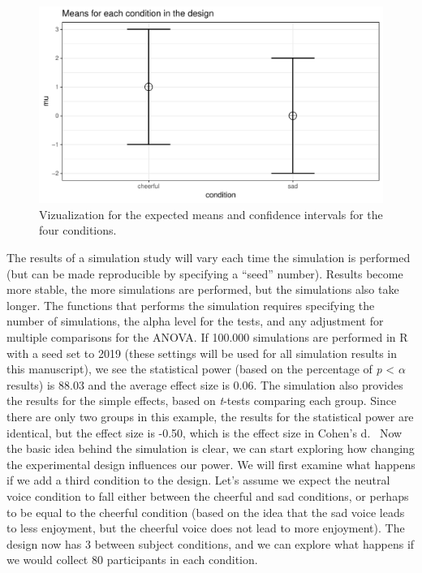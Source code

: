 \documentclass[,jou, draftfirst, a4paper,floatsintext]{apa6}
\begin{document}
\begin{figure}
\centering
\includegraphics{0.1_Simulation_Based_Power_Analysis_For_Factorial_ANOVA_Designs_files/figure-latex/mean-plot2-1.pdf}
\caption{\label{fig:mean-plot2}Vizualization for the expected means and confidence intervals for the four conditions.}
\end{figure}

The results of a simulation study will vary each time the simulation is performed (but can be made reproducible by specifying a \enquote{seed} number).
Results become more stable, the more simulations are performed, but the simulations also take longer. The functions that performs the simulation requires specifying the number of simulations, the alpha level for the tests, and any adjustment for multiple comparisons for the ANOVA.
If 100.000 simulations are performed in R with a seed set to 2019 (these settings will be used for all simulation results in this manuscript), we see the statistical power (based on the percentage of \emph{p} \textless{} \(\alpha\) results) is 88.03 and the average effect size is 0.06.
The simulation also provides the results for the simple effects, based on \emph{t}-tests comparing each group.
Since there are only two groups in this example, the results for the statistical power are identical, but the effect size is -0.50, which is the effect size in Cohen's d.~
Now the basic idea behind the simulation is clear, we can start exploring how changing the experimental design influences our power.
We will first examine what happens if we add a third condition to the design.
Let's assume we expect the neutral voice condition to fall either between the cheerful and sad conditions, or perhaps to be equal to the cheerful condition (based on the idea that the sad voice leads to less enjoyment, but the cheerful voice does not lead to more enjoyment).
The design now has 3 between subject conditions, and we can explore what happens if we would collect 80 participants in each condition.
\end{document}
